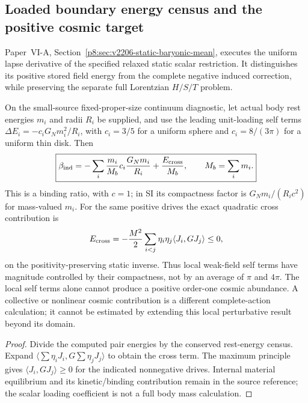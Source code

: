 \documentclass[12pt,a4paper]{article}
\begin{document}
\subsection{Loaded boundary energy census and the positive cosmic target}
\label{p9:sec:v2206-loaded-energy-census}

Paper~VI-A, Section~\ref{p8:sec:v2206-static-baryonic-mean}, executes
the uniform lapse derivative of the specified relaxed static scalar
restriction. It distinguishes its positive stored field energy from
the complete negative induced correction, while preserving the
separate full Lorentzian $H/S/T$ problem.

\begin{proposition}
\label{p9:prop:v2206-loaded-shape-weighting}
On the small-source fixed-proper-size continuum diagnostic, let actual
body rest energies $m_i$ and radii $R_i$ be supplied, and use the leading
unit-loading self terms
$\Delta E_i=-c_iG_Nm_i^2/R_i$, with $c_i=3/5$ for a uniform sphere
and $c_i=8/(3\pi)$ for a uniform thin disk. Then
\begin{equation}
\label{p9:eq:v2206-loaded-shape-weighting}
 \boxed{\beta_{\rm ind}
 =-\sum_i\frac{m_i}{M_b}c_i\frac{G_Nm_i}{R_i}
       +\frac{E_{\rm cross}}{M_b},\qquad M_b=\sum_i m_i.}
\end{equation}
This is a binding ratio, with $c=1$; in SI its compactness factor is
$G_Nm_i/(R_ic^2)$ for mass-valued $m_i$.
For the same positive drives the exact quadratic cross contribution is
\[
 E_{\rm cross}=-\frac{M^2}{2}
       \sum_{i<j}\eta_i\eta_j\langle J_i,GJ_j\rangle\le0,
\]
on the positivity-preserving static inverse. Thus local weak-field self
terms have magnitude controlled by their compactness, not by an average
of $\pi$ and $4\pi$. The local self terms alone cannot produce a positive
order-one cosmic abundance. A collective or nonlinear cosmic contribution
is a different complete-action calculation; it cannot be estimated by
extending this local perturbative result beyond its domain.
\end{proposition}
\begin{proof}
Divide the computed pair energies by the conserved rest-energy census.
Expand $\langle\sum\eta_iJ_i,G\sum\eta_jJ_j\rangle$ to obtain the cross
term. The maximum principle gives $\langle J_i,GJ_j\rangle\ge0$ for
the indicated nonnegative drives. Internal material equilibrium and
its kinetic/binding contribution remain in the source reference; the
scalar loading coefficient is not a full body mass calculation.
\end{proof}
\end{document}
